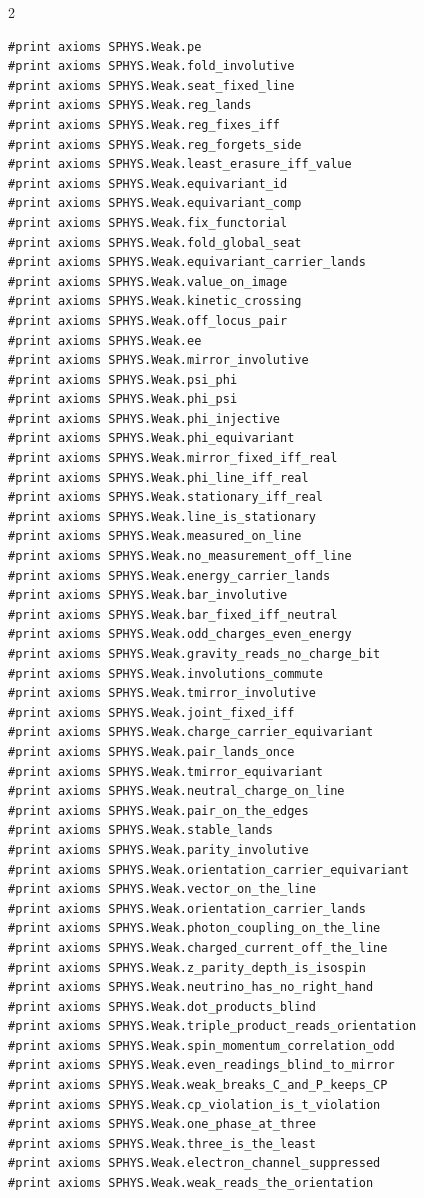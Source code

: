 \documentclass[10pt]{article}
\begin{document}
\begin{multicols}{2}
\begin{Verbatim}[fontsize=\fontsize{6.2}{7.2}\selectfont,breaklines,breakanywhere,breaksymbolleft={}]
#print axioms SPHYS.Weak.pe
#print axioms SPHYS.Weak.fold_involutive
#print axioms SPHYS.Weak.seat_fixed_line
#print axioms SPHYS.Weak.reg_lands
#print axioms SPHYS.Weak.reg_fixes_iff
#print axioms SPHYS.Weak.reg_forgets_side
#print axioms SPHYS.Weak.least_erasure_iff_value
#print axioms SPHYS.Weak.equivariant_id
#print axioms SPHYS.Weak.equivariant_comp
#print axioms SPHYS.Weak.fix_functorial
#print axioms SPHYS.Weak.fold_global_seat
#print axioms SPHYS.Weak.equivariant_carrier_lands
#print axioms SPHYS.Weak.value_on_image
#print axioms SPHYS.Weak.kinetic_crossing
#print axioms SPHYS.Weak.off_locus_pair
#print axioms SPHYS.Weak.ee
#print axioms SPHYS.Weak.mirror_involutive
#print axioms SPHYS.Weak.psi_phi
#print axioms SPHYS.Weak.phi_psi
#print axioms SPHYS.Weak.phi_injective
#print axioms SPHYS.Weak.phi_equivariant
#print axioms SPHYS.Weak.mirror_fixed_iff_real
#print axioms SPHYS.Weak.phi_line_iff_real
#print axioms SPHYS.Weak.stationary_iff_real
#print axioms SPHYS.Weak.line_is_stationary
#print axioms SPHYS.Weak.measured_on_line
#print axioms SPHYS.Weak.no_measurement_off_line
#print axioms SPHYS.Weak.energy_carrier_lands
#print axioms SPHYS.Weak.bar_involutive
#print axioms SPHYS.Weak.bar_fixed_iff_neutral
#print axioms SPHYS.Weak.odd_charges_even_energy
#print axioms SPHYS.Weak.gravity_reads_no_charge_bit
#print axioms SPHYS.Weak.involutions_commute
#print axioms SPHYS.Weak.tmirror_involutive
#print axioms SPHYS.Weak.joint_fixed_iff
#print axioms SPHYS.Weak.charge_carrier_equivariant
#print axioms SPHYS.Weak.pair_lands_once
#print axioms SPHYS.Weak.tmirror_equivariant
#print axioms SPHYS.Weak.neutral_charge_on_line
#print axioms SPHYS.Weak.pair_on_the_edges
#print axioms SPHYS.Weak.stable_lands
#print axioms SPHYS.Weak.parity_involutive
#print axioms SPHYS.Weak.orientation_carrier_equivariant
#print axioms SPHYS.Weak.vector_on_the_line
#print axioms SPHYS.Weak.orientation_carrier_lands
#print axioms SPHYS.Weak.photon_coupling_on_the_line
#print axioms SPHYS.Weak.charged_current_off_the_line
#print axioms SPHYS.Weak.z_parity_depth_is_isospin
#print axioms SPHYS.Weak.neutrino_has_no_right_hand
#print axioms SPHYS.Weak.dot_products_blind
#print axioms SPHYS.Weak.triple_product_reads_orientation
#print axioms SPHYS.Weak.spin_momentum_correlation_odd
#print axioms SPHYS.Weak.even_readings_blind_to_mirror
#print axioms SPHYS.Weak.weak_breaks_C_and_P_keeps_CP
#print axioms SPHYS.Weak.cp_violation_is_t_violation
#print axioms SPHYS.Weak.one_phase_at_three
#print axioms SPHYS.Weak.three_is_the_least
#print axioms SPHYS.Weak.electron_channel_suppressed
#print axioms SPHYS.Weak.weak_reads_the_orientation
\end{Verbatim}
\end{multicols}
\end{document}
